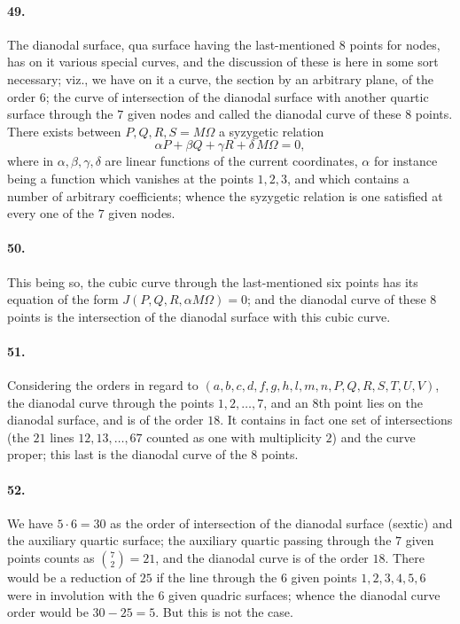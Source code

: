 \documentclass[11pt,a4paper]{article}
\begin{document}
\paragraph{49.}
The dianodal surface, qua surface having the last-mentioned $8$ points for nodes, has on
it various special curves, and the discussion of these is here in some sort necessary;
viz., we have on it a curve, the section by an arbitrary plane, of the order $6$; the
curve of intersection of the dianodal surface with another quartic surface through the
$7$ given nodes and called the dianodal curve of these $8$ points. There exists between
$P, Q, R, S = M \Omega$ a syzygetic relation
\[
\alpha P + \beta Q + \gamma R + \delta\, M \Omega = 0,
\]
where in $\alpha, \beta, \gamma, \delta$ are linear functions of the current coordinates,
$\alpha$ for instance being a function which vanishes at the points $1, 2, 3$, and which
contains a number of arbitrary coefficients; whence the syzygetic relation is one
satisfied at every one of the $7$ given nodes.

\paragraph{50.}
This being so, the cubic curve through the last-mentioned six points has its equation of
the form $J(P, Q, R, \alpha M \Omega) = 0$; and the dianodal curve of these $8$ points is
the intersection of the dianodal surface with this cubic curve.

\paragraph{51.}
Considering the orders in regard to $(a, b, c, d, f, g, h, l, m, n, P, Q, R, S, T, U, V)$,
the dianodal curve through the points $1, 2, \ldots, 7$, and an $8$th point lies on the
dianodal surface, and is of the order $18$. It contains in fact one set of intersections
(the $21$ lines $12, 13, \ldots, 67$ counted as one with multiplicity $2$) and the curve
proper; this last is the dianodal curve of the $8$ points.

\paragraph{52.}
We have $5 \cdot 6 = 30$ as the order of intersection of the dianodal surface (sextic) and
the auxiliary quartic surface; the auxiliary quartic passing through the $7$ given points
counts as $\binom{7}{2} = 21$, and the dianodal curve is of the order $18$. There would
be a reduction of $25$ if the line through the $6$ given points $1, 2, 3, 4, 5, 6$ were
in involution with the $6$ given quadric surfaces; whence the dianodal curve order would
be $30 - 25 = 5$. But this is not the case.
\end{document}
